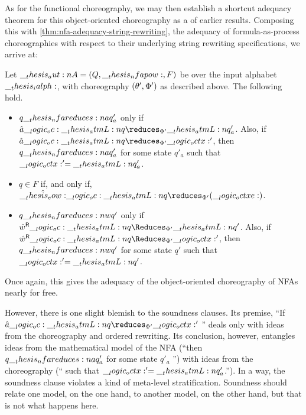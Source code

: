 As for the functional choreography, we may then establish a shortcut adequacy theorem for this object-oriented choreography as a  of earlier results.
Composing this  with \cref{thm:nfa-adequacy-string-rewriting}, the adequacy of formula-as-process choreographies with respect to their underlying string rewriting specifications, we arrive at:
\begin{corollary}\label{cor:formula-as-process:nfa-oochor-adequacy}
  Let $\__thesis_aut:n {A} = (Q, \__thesis_nfapow:, F)$ be  over the input alphabet $\__thesis_ialph:$, with choreography $(\theta', \Phi')$ as described above.
  The following hold.
  \begin{itemize}[nosep]
  \item
    $q \nfareduces[a] q'_a$ only if $\defp{a} \oc \atmL{q} \reduces_{\orsig'} \atmL{q}'_a$.
    Also, if $\defp{a} \oc \atmL{q} \reduces_{\orsig'} \octx'$, then $q \nfareduces[a] q'_a$ for some state $q'_a$ such that $\__logic_octx:' = \__thesis_atmL:n {q}'_a$.
  \item
    $q \in F$ if, and only if, $\defp{\eow} \oc \atmL{q} \reduces_{\orsig'} (\octxe)$.
  \item
    $q \nfareduces[w] q'$ only if $\rev{\defp{w}} \oc \atmL{q} \Reduces_{\orsig'} \atmL{q}'$.
    Also, if $\rev{\defp{w}} \oc \atmL{q} \Reduces_{\orsig'} \octx'$, then $q \nfareduces[w] q'$ for some state $q'$ such that $\__logic_octx:' = \__thesis_atmL:n {q}'$.
  \end{itemize}
\end{corollary}
\noindent
Once again, this gives the adequacy of the object-oriented choreography of \acp{NFA} nearly for free.

However, there is one slight blemish to the soundness clauses.
Its premise, \enquote{If $\defp{a} \oc \atmL{q} \reduces_{\orsig'} \octx'$ \textelp{}} deals only with ideas from the choreography and ordered rewriting.
Its conclusion, however, entangles ideas from the mathematical model of the \ac{NFA} (\enquote{then $q \nfareduces[a] q'_a$ for some state $q'_a$ \textelp{}}) with ideas from the choreography (\enquote{\textelp{} such that $\__logic_octx:' = \__thesis_atmL:n {q}'_a$.}).
In a way, the soundness clause violates a kind of meta-level stratification.
Soundness should relate one model, on the one hand, to another model, on the other hand, but that is not what happens here.

